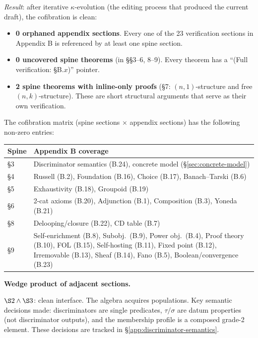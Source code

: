 \emph{Result}: after iterative $\kappa$-evolution (the
editing process that produced the current draft), the
cofibration is clean:
\begin{itemize}[nosep]
  \item \textbf{0 orphaned appendix sections}. Every one
    of the 23 verification sections in Appendix B is
    referenced by at least one spine section.
  \item \textbf{0 uncovered spine theorems} (in
    \S\S3--6, 8--9). Every theorem has a
    ``(Full verification: \S B.$x$)'' pointer.
  \item \textbf{2 spine theorems with inline-only proofs}
    (\S7: $(n,1)$-structure and free $(n,k)$-structure).
    These are short structural arguments that serve as
    their own verification.
\end{itemize}

The cofibration matrix (spine sections $\times$ appendix
sections) has the following non-zero entries:

\begin{center}
\small
\begin{tabular}{l|l}
\textbf{Spine} & \textbf{Appendix B coverage} \\
\hline
\S3 & Discriminator semantics (B.24),
  concrete model (\S\ref{sec:concrete-model}) \\
\S4 & Russell (B.2), Foundation (B.16), Choice (B.17),
  Banach--Tarski (B.6) \\
\S5 & Exhaustivity (B.18), Groupoid (B.19) \\
\S6 & 2-cat axioms (B.20), Adjunction (B.1),
  Composition (B.3), Yoneda (B.21) \\
\S8 & Delooping/closure (B.22), CD table (B.7) \\
\S9 & Self-enrichment (B.8), Subobj.\ (B.9),
  Power obj.\ (B.4), Proof theory (B.10),
  FOL (B.15), Self-hosting (B.11),
  Fixed point (B.12), Irremovable (B.13),
  Sheaf (B.14), Fano (B.5),
  Boolean/convergence (B.23) \\
\end{tabular}
\end{center}

\medskip
\noindent\textbf{Wedge product of adjacent sections.}

$\S2 \wedge \S3$: clean interface. The algebra
acquires populations. Key semantic decisions made:
discriminators are single predicates, $\tau/\sigma$
are datum properties (not discriminator outputs),
and the membership profile is a composed grade-2
element. These decisions are tracked in
\S\ref{app:discriminator-semantics}.

